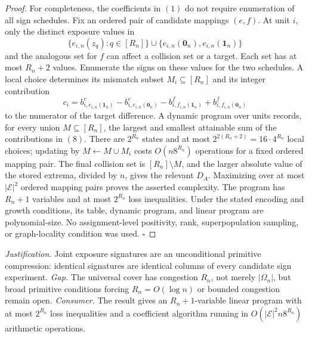 \documentclass{article}
\begin{document}
\begin{proof}
For completeness, the coefficients in \((1)\) do not require enumeration of all sign schedules. Fix an ordered pair of candidate mappings \((e,f)\). At unit \(i\), only the distinct exposure values in
\[
 \{e_{i,n}(z_q):q\in[R_n]\}
 \cup\{e_{i,n}(\mathbf 0_n),e_{i,n}(\mathbf 1_n)\}
\]
and the analogous set for \(f\) can affect a collision set or a target. Each set has at most \(R_n+2\) values. Enumerate the signs on these values for the two schedules. A local choice determines its mismatch subset \(M_i\subseteq[R_n]\) and its integer contribution
\[
 c_i=
 b^e_{i,e_{i,n}(\mathbf 1_n)}-b^e_{i,e_{i,n}(\mathbf 0_n)}
 -b^f_{i,f_{i,n}(\mathbf 1_n)}+b^f_{i,f_{i,n}(\mathbf 0_n)} \tag{8}
\]
to the numerator of the target difference. A dynamic program over units records, for every union \(M\subseteq[R_n]\), the largest and smallest attainable sum of the contributions in \((8)\). There are \(2^{R_n}\) states and at most \(2^{2(R_n+2)}=16\cdot4^{R_n}\) local choices; updating by \(M\leftarrow M\cup M_i\) costs \(O(n8^{R_n})\) operations for a fixed ordered mapping pair. The final collision set is \([R_n]\setminus M\), and the larger absolute value of the stored extrema, divided by \(n\), gives the relevant \(D_A\). Maximizing over at most \(|\mathcal E|^2\) ordered mapping pairs proves the asserted complexity. The program has \(R_n+1\) variables and at most \(2^{R_n}\) loss inequalities. Under the stated encoding and growth conditions, its table, dynamic program, and linear program are polynomial-size. No assignment-level positivity, rank, superpopulation sampling, or graph-locality condition was used. \(\square\)
\end{proof}
\par\smallskip\noindent \textit{Justification.} Joint exposure signatures are an unconditional primitive compression: identical signatures are identical columns of every candidate sign experiment. \textit{Gap.} The universal cover has congestion \(R_n\), not merely \(|\Omega_n|\), but broad primitive conditions forcing \(R_n=O(\log n)\) or bounded congestion remain open. \textit{Consumer.} The result gives an \(R_n+1\)-variable linear program with at most \(2^{R_n}\) loss inequalities and a coefficient algorithm running in \(O(|\mathcal E|^2n8^{R_n})\) arithmetic operations.
\end{document}

